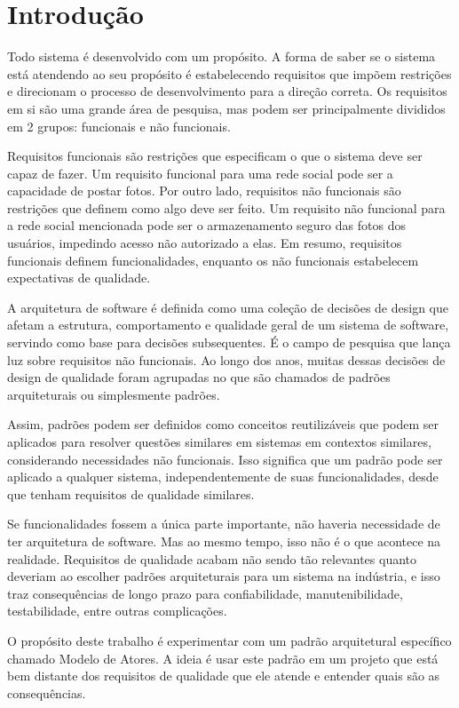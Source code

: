 \section{Introdução}

Todo sistema é desenvolvido com um propósito. A forma de saber se o sistema está atendendo ao seu propósito é estabelecendo requisitos que impõem restrições e direcionam o processo de desenvolvimento para a direção correta. Os requisitos em si são uma grande área de pesquisa, mas podem ser principalmente divididos em 2 grupos: funcionais e não funcionais.

Requisitos funcionais são restrições que especificam o que o sistema deve ser capaz de fazer. Um requisito funcional para uma rede social pode ser a capacidade de postar fotos. Por outro lado, requisitos não funcionais são restrições que definem como algo deve ser feito. Um requisito não funcional para a rede social mencionada pode ser o armazenamento seguro das fotos dos usuários, impedindo acesso não autorizado a elas. Em resumo, requisitos funcionais definem funcionalidades, enquanto os não funcionais estabelecem expectativas de qualidade.

A arquitetura de software é definida como uma coleção de decisões de design que afetam a estrutura, comportamento e qualidade geral de um sistema de software, servindo como base para decisões subsequentes. É o campo de pesquisa que lança luz sobre requisitos não funcionais. Ao longo dos anos, muitas dessas decisões de design de qualidade foram agrupadas no que são chamados de padrões arquiteturais ou simplesmente padrões.

Assim, padrões podem ser definidos como conceitos reutilizáveis que podem ser aplicados para resolver questões similares em sistemas em contextos similares, considerando necessidades não funcionais. Isso significa que um padrão pode ser aplicado a qualquer sistema, independentemente de suas funcionalidades, desde que tenham requisitos de qualidade similares.

Se funcionalidades fossem a única parte importante, não haveria necessidade de ter arquitetura de software. Mas ao mesmo tempo, isso não é o que acontece na realidade. Requisitos de qualidade acabam não sendo tão relevantes quanto deveriam ao escolher padrões arquiteturais para um sistema na indústria, e isso traz consequências de longo prazo para confiabilidade, manutenibilidade, testabilidade, entre outras complicações.

O propósito deste trabalho é experimentar com um padrão arquitetural específico chamado Modelo de Atores. A ideia é usar este padrão em um projeto que está bem distante dos requisitos de qualidade que ele atende e entender quais são as consequências.
